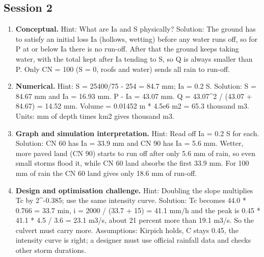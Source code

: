 \documentclass[11pt,a4paper]{article}
\begin{document}
\subsection*{Session 2}
\begin{enumerate}[nosep]
\item \textbf{Conceptual.} Hint: What are Ia and S physically? Solution: The ground has to satisfy an initial loss Ia (hollows, wetting) before any water runs off, so for P at or below Ia there is no run-off. After that the ground keeps taking water, with the total kept after Ia tending to S, so Q is always smaller than P. Only CN = 100 (S = 0, roofs and water) sends all rain to run-off.
\item \textbf{Numerical.} Hint: S = 25400/75 - 254 = 84.7 mm; Ia = 0.2 S. Solution: S = 84.67 mm and Ia = 16.93 mm. P - Ia = 43.07 mm. Q = 43.07\textasciicircum{}2 / (43.07 + 84.67) = 14.52 mm. Volume = 0.01452 m * 4.5e6 m2 = 65.3 thousand m3. Units: mm of depth times km2 gives thousand m3.
\item \textbf{Graph and simulation interpretation.} Hint: Read off Ia = 0.2 S for each. Solution: CN 60 has Ia = 33.9 mm and CN 90 has Ia = 5.6 mm. Wetter, more paved land (CN 90) starts to run off after only 5.6 mm of rain, so even small storms flood it, while CN 60 land absorbs the first 33.9 mm. For 100 mm of rain the CN 60 land gives only 18.6 mm of run-off.
\item \textbf{Design and optimisation challenge.} Hint: Doubling the slope multiplies Tc by 2\textasciicircum{}-0.385; use the same intensity curve. Solution: Tc becomes 44.0 * 0.766 = 33.7 min, i = 2000 / (33.7 + 15) = 41.1 mm/h and the peak is 0.45 * 41.1 * 4.5 / 3.6 = 23.1 m3/s, about 21 percent more than 19.1 m3/s. So the culvert must carry more. Assumptions: Kirpich holds, C stays 0.45, the intensity curve is right; a designer must use official rainfall data and checks other storm durations.
\end{enumerate}
\end{document}
